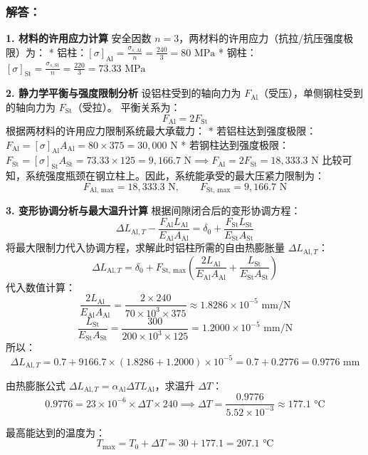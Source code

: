 \documentclass[UTF8,fontset=windows]{ctexart}
\begin{document}
\subsubsection*{解答：}

\textbf{1. 材料的许用应力计算}
安全因数 $n = 3$，两材料的许用应力（抗拉/抗压强度极限）为：
*   铝柱：$[\sigma]_{\text{Al}} = \frac{\sigma_{s, \text{Al}}}{n} = \frac{240}{3} = 80\text{ MPa}$
*   钢柱：$[\sigma]_{\text{St}} = \frac{\sigma_{s, \text{St}}}{n} = \frac{220}{3} = 73.33\text{ MPa}$

\textbf{2. 静力学平衡与强度限制分析}
设铝柱受到的轴向力为 $F_{\text{Al}}$（受压），单侧钢柱受到的轴向力为 $F_{\text{St}}$（受拉）。
平衡关系为：
\[
    F_{\text{Al}} = 2 F_{\text{St}}
\]
根据两材料的许用应力限制系统最大承载力：
*   若铝柱达到强度极限：$F_{\text{Al}} = [\sigma]_{\text{Al}} A_{\text{Al}} = 80 \times 375 = 30,000\text{ N}$
*   若钢柱达到强度极限：$F_{\text{St}} = [\sigma]_{\text{St}} A_{\text{St}} = 73.33 \times 125 = 9,166.7\text{ N} \implies F_{\text{Al}} = 2 F_{\text{St}} = 18,333.3\text{ N}$
比较可知，系统强度瓶颈在钢立柱上。因此，系统能承受的最大压紧力限制为：
\[
    F_{\text{Al, max}} = 18,333.3\text{ N}, \qquad F_{\text{St, max}} = 9,166.7\text{ N}
\]

\textbf{3. 变形协调分析与最大温升计算}
根据间隙闭合后的变形协调方程：
\[
    \Delta L_{\text{Al}, T} - \frac{F_{\text{Al}} L_{\text{Al}}}{E_{\text{Al}} A_{\text{Al}}} = \delta_0 + \frac{F_{\text{St}} L_{\text{St}}}{E_{\text{St}} A_{\text{St}}}
\]
将最大限制力代入协调方程，求解此时铝柱所需的自由热膨胀量 $\Delta L_{\text{Al}, T}$：
\[
    \Delta L_{\text{Al}, T} = \delta_0 + F_{\text{St, max}} \left( \frac{2 L_{\text{Al}}}{E_{\text{Al}} A_{\text{Al}}} + \frac{L_{\text{St}}}{E_{\text{St}} A_{\text{St}}} \right)
\]
代入数值计算：
\[
    \frac{2 L_{\text{Al}}}{E_{\text{Al}} A_{\text{Al}}} = \frac{2 \times 240}{70 \times 10^3 \times 375} \approx 1.8286 \times 10^{-5}\text{ mm/N}
\]
\[
    \frac{L_{\text{St}}}{E_{\text{St}} A_{\text{St}}} = \frac{300}{200 \times 10^3 \times 125} = 1.2000 \times 10^{-5}\text{ mm/N}
\]
所以：
\[
    \Delta L_{\text{Al}, T} = 0.7 + 9166.7 \times (1.8286 + 1.2000) \times 10^{-5} = 0.7 + 0.2776 = 0.9776\text{ mm}
\]

由热膨胀公式 $\Delta L_{\text{Al}, T} = \alpha_{\text{Al}} \Delta T L_{\text{Al}}$，求温升 $\Delta T$：
\[
    0.9776 = 23 \times 10^{-6} \times \Delta T \times 240 \implies \Delta T = \frac{0.9776}{5.52 \times 10^{-3}} \approx 177.1\text{ °C}
\]

最高能达到的温度为：
\[
    T_{\max} = T_0 + \Delta T = 30 + 177.1 = 207.1\text{ °C}
\]
\end{document}

